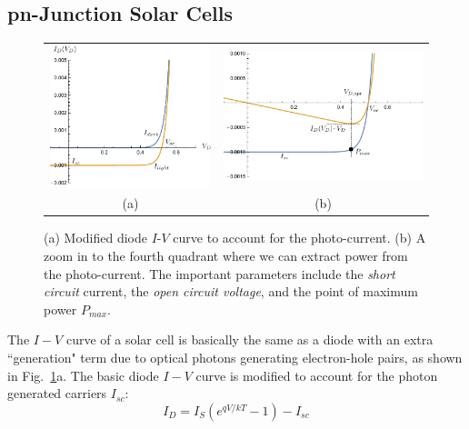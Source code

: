 \subsection{pn-Junction Solar Cells}
\begin{figure}[tb]
\centering
\begin{tabular}{cc}
\includegraphics[width=.45\columnwidth]{solarcell_zoomout.pdf} &
\includegraphics[width=.45\columnwidth]{solarcell.pdf}\\
(a) & (b)\\
\end{tabular}
\caption{(a) Modified diode $I$-$V$ curve to account for the photo-current.  (b)  A zoom in to the fourth quadrant where we can extract power from the photo-current.  The important parameters include the \emph{short circuit} current, the \emph{open circuit voltage}, and the point of maximum power $P_{max}$. }
\label{fig:solarcell_zoom}
\end{figure}
The $I-V$ curve of a solar cell is basically the same as a diode with an extra ``generation" term  due to optical photons generating electron-hole pairs, as shown in Fig.~\ref{fig:solarcell_zoom}a.  The basic diode $I-V$ curve is modified to account for the photon generated carriers $I_{sc}$:
    \begin{equation} 
        I_D = I_S (e^{qV/kT} - 1) - I_{sc}
    \end{equation}
